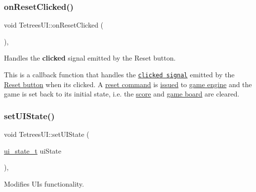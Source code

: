 \subsubsection{\texorpdfstring{on\+Reset\+Clicked()}{onResetClicked()}}
{\footnotesize\ttfamily void Tetrees\+U\+I\+::on\+Reset\+Clicked (\begin{DoxyParamCaption}{ }\end{DoxyParamCaption})\hspace{0.3cm}{\ttfamily [static]}, {\ttfamily [private]}}



Handles the {\bfseries clicked} signal emitted by the Reset button. 

This is a callback function that handles the \href{https://developer.gnome.org/gtk3/stable/GtkButton.html#GtkButton-clicked}{\tt clicked signal} emitted by the \hyperlink{TetreesUI_8cpp_a7ac3df3e3d13ae5bd16828389ba56461}{Reset button} when it\textquotesingle{}s clicked. A \hyperlink{TetreesDefs_8hpp_aadc337e2620d6621659e63e87c45e79dae71f12b62f9fca54c98ef9630f8fcad1}{reset command} is \hyperlink{classTetreesEngine_aa2a283d09b0b6ab7c03ea2265a2e3438}{issued} to \hyperlink{classTetreesUI_a07faa56ea40b28beba7509fa7f65c897}{game engine} and the game is set back to its initial state, i.\+e. the \hyperlink{classTetreesUI_a128491041c6b77acec829fb5b1f4dafb}{score} and \hyperlink{classTetreesEngine_a37d082a7816d6731b2703dd6d1a1cb97}{game board} are cleared. \mbox{\label{classTetreesUI_a195806825b5469dcc99fbca5d14af94f}} 
\subsubsection{\texorpdfstring{set\+U\+I\+State()}{setUIState()}}
{\footnotesize\ttfamily void Tetrees\+U\+I\+::set\+U\+I\+State (\begin{DoxyParamCaption}\item[{\hyperlink{TetreesDefs_8hpp_ab583135648b1264a9f7817709c4dbd3e}{ui\+\_\+state\+\_\+t}}]{ui\+State }\end{DoxyParamCaption})\hspace{0.3cm}{\ttfamily [static]}, {\ttfamily [private]}}



Modifies UI\textquotesingle{}s functionality. 

